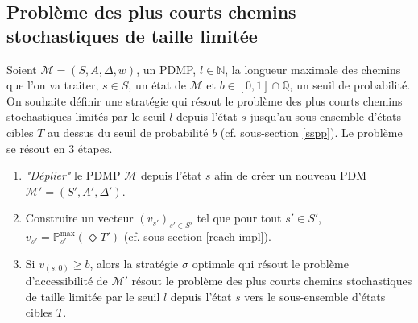 \documentclass[12pt,a4paper]{report}
\theoremstyle{definition}%
\theoremstyle{remark}
\newcommand{\pr}{\mathbb{P}}
\begin{document}
\subsection{Problème des plus courts chemins stochastiques de taille limitée}
Soient $\mathcal{M} = (S, A, \Delta, w)$, un PDMP, $l \in \mathbb{N}$, la
longueur maximale des chemins que l'on va traiter, $s \in S$, un état de
$\mathcal{M}$ et $b \in [0, 1] \cap \mathbb{Q}$, un seuil de probabilité.
On souhaite définir une stratégie qui résout le problème des plus courts
chemins stochastiques limités par le seuil $l$ depuis l'état $s$ jusqu'au sous-ensemble
d'états cibles $T$ au dessus du seuil de probabilité $b$ (cf. sous-section \ref{sspp}).
Le problème se résout en 3 étapes.
\begin{enumerate}
	\item \textit{"Déplier"} le PDMP $\mathcal{M}$ depuis l'état $s$ afin de créer un
		nouveau PDM $\mathcal{M}' = (S', A', \Delta')$.
	\item %
		Construire un vecteur $(v_{s'})_{s' \in S'}$ tel que pour tout $s' \in S'$, $v_{s'} =
		\pr^{\max}_{s'} (\Diamond T')$ (cf. sous-section \ref{reach-impl}).
	\item Si $v_{(s, 0)} \geq b$, alors la stratégie $\sigma$ optimale
		qui résout le problème d'accessibilité de $\mathcal{M}'$ résout le
		problème des plus courts chemins stochastiques de taille limitée par le seuil $l$ depuis l'état $s$ vers le sous-ensemble d'états cibles $T$.
\end{enumerate}
\end{document}
